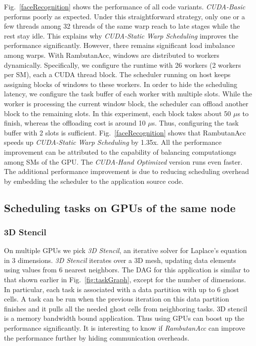 Fig.~\ref{faceRecognition} shows the performance of all code variants.
{\em CUDA-Basic} performs poorly as expected.
Under this straightforward strategy, only one or a few threads among 32 threads of the same warp reach to late stages while the rest stay idle.
This explains why {\em CUDA-Static Warp Scheduling} improves the performance significantly.
However, there remains significant load imbalance among warps.
With RambutanAcc, windows are distributed to workers dynamically.
Specifically, we configure the runtime with 26 workers (2 workers per SM), each a CUDA thread block. 
The scheduler running on host keeps assigning blocks of windows to these workers.
In order to hide the scheduling latency, we configure the task buffer of each worker with multiple slots.
While the worker is processing the current window block, the scheduler can offload another block to the remaining slots.
In this experiment, each block takes about 50 $\mu$s to finish, whereas the offloading cost is around 10 $\mu$s.
Thus, configuring the task buffer with 2 slots is sufficient.
Fig.~\ref{faceRecognition} shows that RambutanAcc speeds up {\em CUDA-Static Warp Scheduling} by 1.35x.
All the performance improvement can be attributed to the capability of balancing computationgs among SMs of the GPU.
The {\em CUDA-Hand Optimized} version runs even faster.
The additional performance improvement is due to reducing scheduling overhead by embedding the scheduler to the application source code.


\subsection{Scheduling tasks on GPUs of the same node}

\subsubsection{3D Stencil}
On multiple GPUs we pick {\em 3D Stencil}, an iterative solver for Laplace's equation in 3 dimensions.
{\em 3D Stencil} iterates over a 3D mesh, updating data elements using values from 6 nearest neighbors.
The DAG for this application is similar to that shown earlier in Fig.~\ref{fig:taskGraph}, except for the number of dimensions.
In particular, each task is associated with a data partition with up to 6 ghost cells.
A task can be run when the previous iteration on this data partition finishes and it pulls all the needed ghost cells from neighboring tasks.
3D stencil is a memory bandwidth bound application. 
Thus using GPUs can boost up the performance significantly.
It is interesting to know if {\em RambutanAcc} can improve the performance further by  hiding communication overheads.

